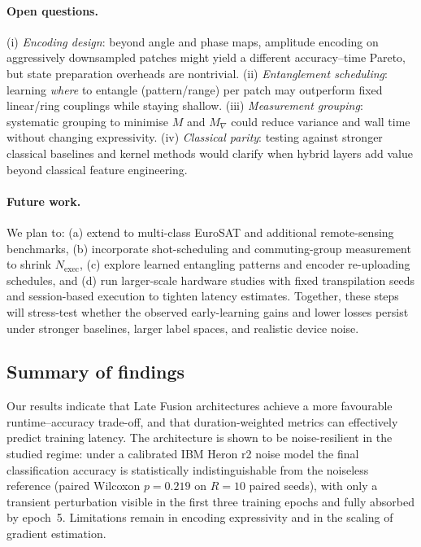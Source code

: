 \paragraph{Open questions.}
(i) \emph{Encoding design}: beyond angle and phase maps, amplitude encoding on aggressively downsampled patches might yield a different accuracy–time Pareto, but state preparation overheads are nontrivial. (ii) \emph{Entanglement scheduling}: learning \emph{where} to entangle (pattern/range) per patch may outperform fixed linear/ring couplings while staying shallow. (iii) \emph{Measurement grouping}: systematic grouping to minimise $M$ and $M_{\!\nabla}$ could reduce variance and wall time without changing expressivity. (iv) \emph{Classical parity}: testing against stronger classical baselines and kernel methods would clarify when hybrid layers add value beyond classical feature engineering.

\paragraph{Future work.}
We plan to: (a) extend to multi-class EuroSAT and additional remote-sensing benchmarks, (b) incorporate shot-scheduling and commuting-group measurement to shrink $N_{\text{exec}}$, (c) explore learned entangling patterns and encoder re-uploading schedules, and (d) run larger-scale hardware studies with fixed transpilation seeds and session-based execution to tighten latency estimates. Together, these steps will stress-test whether the observed early-learning gains and lower losses persist under stronger baselines, larger label spaces, and realistic device noise.

\subsection*{Summary of findings}
Our results indicate that Late Fusion architectures achieve a more favourable runtime--accuracy
trade-off, and that duration-weighted metrics can effectively predict training latency.
The architecture is shown to be noise-resilient in the studied regime: under a calibrated IBM Heron r2 noise model the final classification accuracy is statistically indistinguishable from the noiseless reference (paired Wilcoxon $p=0.219$ on $R=10$ paired seeds), with only a transient perturbation visible in the first three training epochs and fully absorbed by epoch~5.
Limitations remain in encoding expressivity and in the scaling of gradient estimation.

